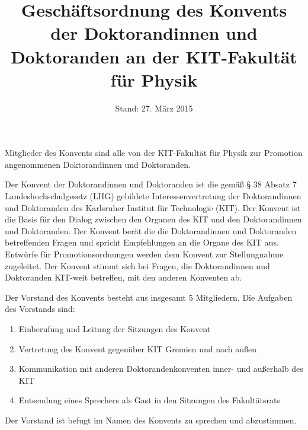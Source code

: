 \documentclass[a4paper, parskip=half, numbers=noenddot]{scrartcl}
\title{Geschäftsordnung des Konvents der Doktorandinnen und Doktoranden an der KIT-Fakultät für Physik}
\date{Stand: 27. März 2015}
\begin{document}
%
%

\maketitle



\begin{contract}


\tableofcontents


%
%





Mitglieder des Konvents sind alle von der KIT-Fakultät für Physik zur Promotion angenommenen Doktorandinnen und Doktoranden. 

%
\label{aufgaben}

Der Konvent der Doktorandinnen und Doktoranden ist die gemäß § 38 Absatz 7 Landeshochschulgesetz (LHG) gebildete Interessenvertretung der Doktorandinnen und Doktoranden des Karlsruher Institut für Technologie (KIT). Der Konvent ist die Basis für den Dialog zwischen den Organen des KIT und den Doktorandinnen und Doktoranden. Der Konvent berät die die Doktorandinnen und Doktoranden betreffenden Fragen und spricht Empfehlungen an die Organe des KIT aus. Entwürfe für Promotionsordnungen werden dem Konvent zur Stellungnahme zugeleitet. Der Konvent stimmt sich bei Fragen, die Doktorandinnen und Doktoranden KIT-weit betreffen, mit den anderen Konventen ab.



Der Vorstand des Konvents besteht aus insgesamt 5 Mitgliedern.
Die Aufgaben des Vorstands sind:
\begin{enumerate}
	\item Einberufung und Leitung der Sitzungen des Konvent
	\item Vertretung des Konvent gegenüber KIT Gremien und nach außen
	\item Kommunikation mit anderen Doktorandenkonventen inner- und außerhalb des KIT
	\item Entsendung eines Sprechers als Gast in den Sitzungen des Fakultätsrats
\end{enumerate}
Der Vorstand ist befugt im Namen des Konvents zu sprechen und abzustimmen.


\end{contract}
\end{document}
